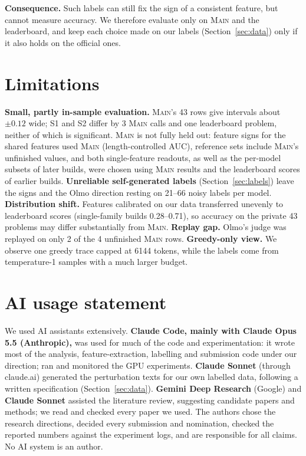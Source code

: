\documentclass{article}
\newcommand{\sone}{\textsc{S1}}
\newcommand{\stwo}{\textsc{S2}}
\begin{document}
\textbf{Consequence.} Such labels can still fix the sign of a consistent feature, but cannot measure accuracy. We therefore evaluate only on \textsc{Main} and the leaderboard, and keep each choice made on our labels (Section~\ref{sec:data}) only if it also holds on the official ones.

\section*{Limitations}
\label{sec:limits}
\textbf{Small, partly in-sample evaluation.} \textsc{Main}'s 43 rows give intervals about $\pm 0.12$ wide; \sone{} and \stwo{} differ by 3 \textsc{Main} calls and one leaderboard problem, neither of which is significant.
\textsc{Main} is not fully held out: feature signs for the shared features used \textsc{Main} (length-controlled AUC), reference sets include \textsc{Main}'s unfinished values, and both single-feature readouts, as well as the per-model subsets of later builds, were chosen using \textsc{Main} results and the leaderboard scores of earlier builds.
\textbf{Unreliable self-generated labels} (Section~\ref{sec:labels}) leave the signs and the Olmo direction resting on 21--66 noisy labels per model.
\textbf{Distribution shift.} Features calibrated on our data transferred unevenly to leaderboard scores (single-family builds 0.28--0.71), so accuracy on the private 43 problems may differ substantially from \textsc{Main}.
\textbf{Replay gap.} Olmo's judge was replayed on only 2 of the 4 unfinished \textsc{Main} rows.
\textbf{Greedy-only view.} We observe one greedy trace capped at 6144 tokens, while the labels come from temperature-1 samples with a much larger budget.

\section*{AI usage statement}
We used AI assistants extensively.
\textbf{Claude Code, mainly with Claude Opus 5.5 (Anthropic),} was used for much of the code and experimentation: it wrote most of the analysis, feature-extraction, labelling and submission code under our direction; ran and monitored the GPU experiments.
\textbf{Claude Sonnet} (through claude.ai) generated the perturbation texts for our own labelled data, following a written specification (Section~\ref{sec:data}).
\textbf{Gemini Deep Research} (Google) and \textbf{Claude Sonnet} assisted the literature review, suggesting candidate papers and methods; we read and checked every paper we used.
The authors chose the research directions, decided every submission and nomination, checked the reported numbers against the experiment logs, and are responsible for all claims. No AI system is an author.
\end{document}
